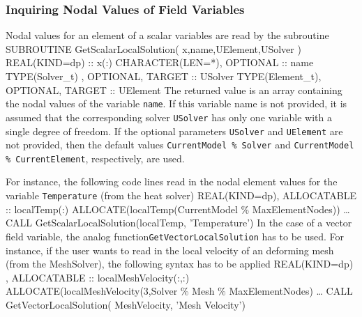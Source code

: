 \subsubsection{Inquiring Nodal Values of Field Variables}
Nodal values for an element of a scalar variables are read by the subroutine
\ttbegin
SUBROUTINE GetScalarLocalSolution( x,name,UElement,USolver )
     REAL(KIND=dp) :: x(:)
     CHARACTER(LEN=*), OPTIONAL :: name
     TYPE(Solver_t)  , OPTIONAL, TARGET :: USolver
     TYPE(Element_t),  OPTIONAL, TARGET :: UElement
\ttend
The returned value is an array containing the nodal values of the variable \texttt{name}. If this variable name is not provided, it is assumed that the corresponding solver \texttt{USolver} has only one variable with a single degree of freedom. If the optional parameters \texttt{USolver} and \texttt{UElement} are not provided, then the default values \texttt{CurrentModel \% Solver} and \texttt{CurrentModel \% CurrentElement}, respectively, are used.

For instance, the following code lines read in the nodal element values for the variable \texttt{Temperature} (from the heat solver)
\ttbegin
REAL(KIND=dp), ALLOCATABLE :: localTemp(:)
ALLOCATE(localTemp(CurrentModel \% MaxElementNodes))
\ldots
CALL GetScalarLocalSolution(localTemp, 'Temperature')
\ttend
In the case of a vector field variable, the analog function\linebreak \texttt{GetVectorLocalSolution} has to be used. For instance, if the user wants to read in the local velocity of an deforming mesh (from the MeshSolver), the following syntax has to be applied
\ttbegin
REAL(KIND=dp) , ALLOCATABLE :: localMeshVelocity(:,:)
ALLOCATE(localMeshVelocity(3,Solver \% Mesh \% MaxElementNodes)
\ldots
CALL GetVectorLocalSolution( MeshVelocity, 'Mesh Velocity')
\ttend

